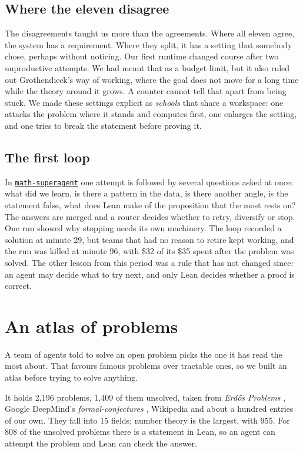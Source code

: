 \documentclass[11pt]{amsart}
\newcommand{\repo}[1]{\href{https://github.com/senamakel/#1}{\texttt{#1}}}
\begin{document}
\subsection*{Where the eleven disagree} The disagreements taught us more than the agreements. Where all eleven agree, the system has a requirement. Where they split, it has a setting that somebody chose, perhaps without noticing. Our first runtime changed course after two unproductive attempts. We had meant that as a budget limit, but it also ruled out Grothendieck's way of working, where the goal does not move for a long time while the theory around it grows. A counter cannot tell that apart from being stuck. We made these settings explicit as \emph{schools} that share a workspace: one attacks the problem where it stands and computes first, one enlarges the setting, and one tries to break the statement before proving it.

\subsection*{The first loop} In \repo{math-superagent} \cite{superagent} one attempt is followed by several questions asked at once: what did we learn, is there a pattern in the data, is there another angle, is the statement false, what does Lean make of the proposition that the most rests on? The answers are merged and a router decides whether to retry, diversify or stop. One run showed why stopping needs its own machinery. The loop recorded a solution at minute 29, but teams that had no reason to retire kept working, and the run was killed at minute 96, with \$32 of its \$35 spent after the problem was solved. The other lesson from this period was a rule that has not changed since: an agent may decide what to try next, and only Lean decides whether a proof is correct.

\section{An atlas of problems}

A team of agents told to solve an open problem picks the one it has read the most about. That favours famous problems over tractable ones, so we built an atlas before trying to solve anything.

It holds 2{,}196 problems, 1{,}409 of them unsolved, taken from \emph{Erd\H{o}s Problems} \cite{erdosproblems}, Google DeepMind's \emph{formal-conjectures} \cite{formalconj}, Wikipedia and about a hundred entries of our own. They fall into 15 fields; number theory is the largest, with 955. For 808 of the unsolved problems there is a statement in Lean, so an agent can attempt the problem and Lean can check the answer.
\end{document}
